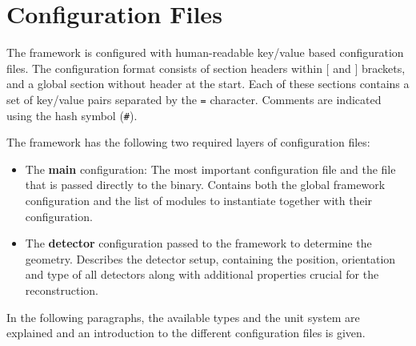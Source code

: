 \chapter{Configuration Files}
\label{ch:configuration_files}
The framework is configured with human-readable key/value based configuration files.
The configuration format consists of section headers within $[$ and $]$ brackets, and a global section without header at the start.
Each of these sections contains a set of key/value pairs separated by the \texttt{=} character.
Comments are indicated using the hash symbol (\texttt{\#}).

The framework has the following two required layers of configuration files:
\begin{itemize}
\item The \textbf{main} configuration: The most important configuration file and the file that is passed directly to the binary.
Contains both the global framework configuration and the list of modules to instantiate together with their configuration.

\item The \textbf{detector} configuration passed to the framework to determine the geometry.
Describes the detector setup, containing the position, orientation and type of all detectors along with additional properties crucial for the reconstruction.
\end{itemize}

In the following paragraphs, the available types and the unit system are explained and an introduction to the different configuration files is given.

